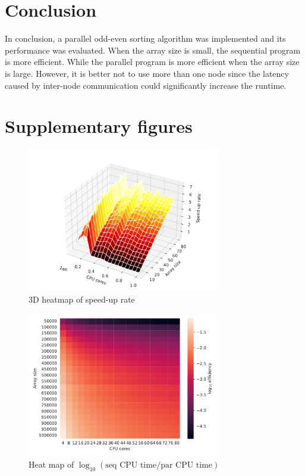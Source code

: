 \documentclass[twoside,12pt]{article}
\theoremstyle{definition}
\theoremstyle{remark}
\begin{document}
\section{Conclusion}
In conclusion, a parallel odd-even sorting algorithm was implemented and
its performance was evaluated.
When the array size is small, the sequential program is more efficient.
While the parallel program is more efficient when the array size
is large.
However, it is better not to use more than one node since the latency
caused by inter-node communication could significantly increase the
runtime.



\newpage
\appendix

\newpage
\section{Supplementary figures}
\begin{figure}[H]
    \centering
    \includegraphics[width=0.75\textwidth]{../analysis/rate_heatmap_3d.pdf}
    \caption{3D heatmap of speed-up rate}
    \label{fig:rate-heat3d}
\end{figure}
\begin{figure}[H]
    \centering
    \includegraphics[width=0.75\textwidth]{../analysis/logeff_heatmap.pdf}
    \caption{Heat map of $\log_{10} (\text{seq CPU time}/\text{par CPU time})$ }
    \label{fig:logeff}
\end{figure}
\end{document}
